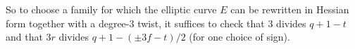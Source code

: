 So to choose a family for which the elliptic curve $E$ can be rewritten in Hessian form together with a degree-3 twist, it suffices to check that 3 divides $q+1-t$ and that $3r$ divides $q + 1 - (\pm 3f - t) / 2$ (for one choice of sign).



